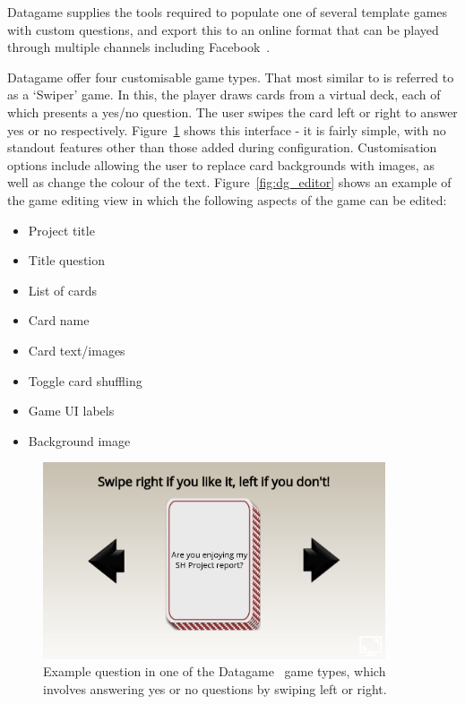 Datagame supplies the tools required to populate one of several template games with custom questions, and export this to an online format that can be played through multiple channels including Facebook~\cite{Facebook}. 

Datagame offer four customisable game types. That most similar to \od{} is referred to as a `Swiper' game. In this, the player draws cards from a virtual deck, each of which presents a yes/no question. The user swipes the card left or right to answer yes or no respectively. Figure~\ref{fig:datagame} shows this interface - it is fairly simple, with no standout features other than those added during configuration. Customisation options include allowing the user to replace card backgrounds with images, as well as change the colour of the text. Figure~\ref{fig:dg_editor} shows an example of the game editing view in which the following aspects of the game can be edited:

\begin{itemize}
    \item Project title
    \item Title question
    \item List of cards
    \item Card name
    \item Card text/images
    \item Toggle card shuffling
    \item Game UI labels
    \item Background image
\end{itemize}

\begin{figure}[!h]
	\centering
	\includegraphics[width=0.9\textwidth]{./images/context/datagame.png}
	\caption{Example question in one of the Datagame~\cite{Datagame} game types, which involves answering yes or no questions by swiping left or right.}
	\label{fig:datagame}
\end{figure}


